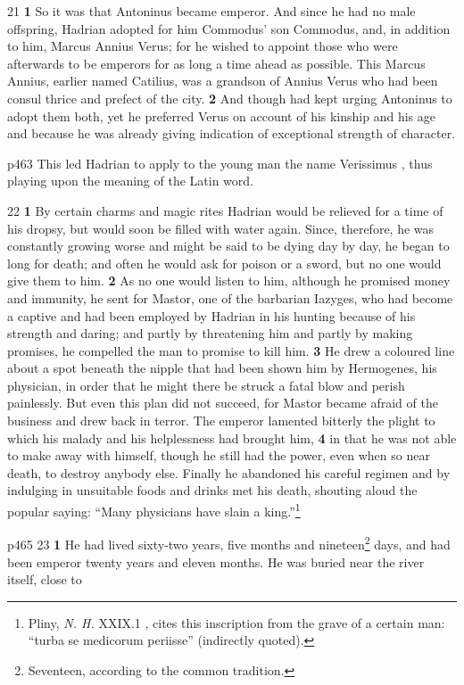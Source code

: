 21
\textbf{1} So it was that Antoninus became emperor. And since he had no male offspring, Hadrian adopted for him Commodus' son Commodus, and, in addition to him, Marcus Annius Verus; for he wished to appoint those who were afterwards to be emperors for as long a time ahead as possible. This Marcus Annius, earlier named Catilius, was a grandson of Annius Verus who had been consul thrice and prefect of the city. \textbf{2} And though had kept urging Antoninus to adopt them both, yet he preferred Verus on account of his kinship and his age and because he was already giving indication of exceptional strength of character.

p463 This led Hadrian to apply to the young man the name Verissimus , thus playing upon the meaning of the Latin word.

22
\textbf{1} By certain charms and magic rites Hadrian would be relieved for a time of his dropsy, but would soon be filled with water again. Since, therefore, he was constantly growing worse and might be said to be dying day by day, he began to long for death; and often he would ask for poison or a sword, but no one would give them to him. \textbf{2} As no one would listen to him, although he promised money and immunity, he sent for Mastor, one of the barbarian Iazyges, who had become a captive and had been employed by Hadrian in his hunting because of his strength and daring; and partly by threatening him and partly by making promises, he compelled the man to promise to kill him. \textbf{3} He drew a coloured line about a spot beneath the nipple that had been shown him by Hermogenes, his physician, in order that he might there be struck a fatal blow and perish painlessly. But even this plan did not succeed, for Mastor became afraid of the business and drew back in terror. The emperor lamented bitterly the plight to which his malady and his helplessness had brought him, \textbf{4} in that he was not able to make away with himself, though he still had the power, even when so near death, to destroy anybody else. Finally he abandoned his careful regimen and by indulging in unsuitable foods and drinks met his death, shouting aloud the popular saying: ``Many physicians have slain a king.''\footnote{Pliny,
\emph{N. H.} XXIX.1 , cites this inscription from the grave of a certain man: ``turba se medicorum periisse'' (indirectly quoted).

}

p465
23
\textbf{1} He had lived sixty-two years, five months and nineteen\texthebrew{⁠}\footnote{Seventeen, according to the common tradition.

} days, and had been emperor twenty years and eleven months. He was buried near the river itself, close to

